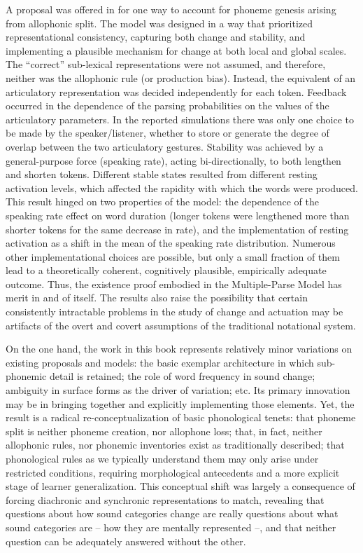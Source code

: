 A proposal was offered in  for one
way to account for phoneme genesis arising from allophonic split.
The model was designed in a way that prioritized representational
consistency, capturing both change and stability, and implementing
a plausible mechanism for change at both local and global scales.
The “correct” sub-lexical representations were not assumed,
and therefore, neither was the allophonic rule (or production bias).
Instead, the equivalent of an articulatory representation was decided
independently for each token. Feedback occurred in the dependence
of the parsing probabilities on the values of the articulatory parameters.
In the reported simulations there was only one choice to be made by
the speaker/listener, whether to store or generate the degree of overlap
between the two articulatory gestures. Stability was achieved by a
general-purpose force (speaking rate), acting bi-directionally, to
both lengthen and shorten tokens. Different stable states resulted
from different resting activation levels, which affected the rapidity
with which the words were produced. This result hinged on two properties
of the model: the dependence of the speaking rate effect on word duration
(longer tokens were lengthened more than shorter tokens for the same
decrease in rate), and the implementation of resting activation as
a shift in the mean of the speaking rate distribution. Numerous other
implementational choices are possible, but only a small fraction of
them lead to a theoretically coherent, cognitively plausible, empirically
adequate outcome. Thus, the existence proof embodied in the Multiple-Parse
Model has merit in and of itself. The results also raise the possibility
that certain consistently intractable problems in the study of change
and actuation may be artifacts of the overt and covert assumptions
of the traditional notational system.

On the one hand, the work in this book represents relatively minor
variations on existing proposals and models: the basic exemplar architecture
in which sub-phonemic detail is retained; the role of word frequency
in sound change; ambiguity in surface forms as the driver of variation;
etc. Its primary innovation may be in bringing together and explicitly
implementing those elements. Yet, the result is a radical re-conceptualization
of basic phonological tenets: that phoneme split is neither phoneme
creation, nor allophone loss; that, in fact, neither allophonic rules,
nor phonemic inventories exist as traditionally described; that phonological
rules as we typically understand them may only arise under restricted
conditions, requiring morphological antecedents and a more explicit
stage of learner generalization. This conceptual shift was largely
a consequence of forcing diachronic and synchronic representations
to match, revealing that questions about how sound categories change
are really questions about what sound categories are – how they are
mentally represented –, and that neither question can be adequately
answered without the other.
